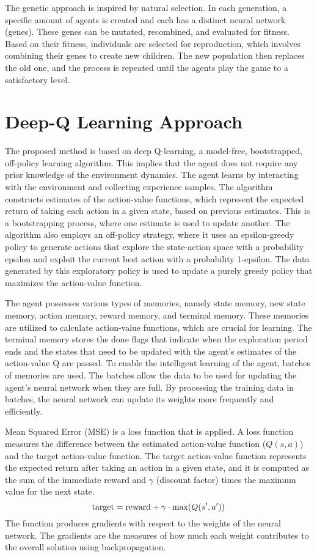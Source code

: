 \documentclass[letterpaper]{article} %
\begin{document}
The genetic approach is inspired by natural selection. In each generation, a specific amount of agents is created and each has a distinct neural network (genes). These genes can be mutated, recombined, and evaluated for fitness. Based on their fitness, individuals are selected for reproduction, which involves combining their genes to create new children. The new population then replaces the old one, and the process is repeated until the agents play the game to a satisfactory level.

\section{Deep-Q Learning Approach}

The proposed method is based on deep Q-learning, a model-free, bootstrapped, off-policy learning algorithm. This implies that the agent does not require any prior knowledge of the environment dynamics. The agent learns by interacting with the environment and collecting experience samples. The algorithm constructs estimates of the action-value functions, which represent the expected return of taking each action in a given state, based on previous estimates. This is a bootstrapping process, where one estimate is used to update another. The algorithm also employs an off-policy strategy, where it uses an epsilon-greedy policy to generate actions that explore the state-action space with a probability epsilon and exploit the current best action with a probability 1-epsilon. The data generated by this exploratory policy is used to update a purely greedy policy that maximizes the action-value function.

\par The agent possesses various types of memories, namely state memory, new state memory, action memory, reward memory, and terminal memory. These memories are utilized to calculate action-value functions, which are crucial for learning. The terminal memory stores the done flags that indicate when the exploration period ends and the states that need to be updated with the agent's estimates of the action-value Q are passed. To enable the intelligent learning of the agent, batches of memories are used. The batches allow the data to be used for updating the agent's neural network when they are full. By processing the training data in batches, the neural network can update its weights more frequently and efficiently.

\par Mean Squared Error (MSE) is a loss function that is applied. A loss function measures the difference between the estimated action-value function ($Q(s, a)$) and the target action-value function. The target action-value function represents the expected return after taking an action in a given state, and it is computed as the sum of the immediate reward and $\gamma$ (discount factor) times the maximum value for the next state.
$$
\textnormal{target} = \textnormal{reward} + \gamma \cdot \textnormal{max}(Q(s', a'))
$$
The function produces gradients with respect to the weights of the neural network. The gradients are the measures of how much each weight contributes to the overall solution using backpropagation.
\end{document}
